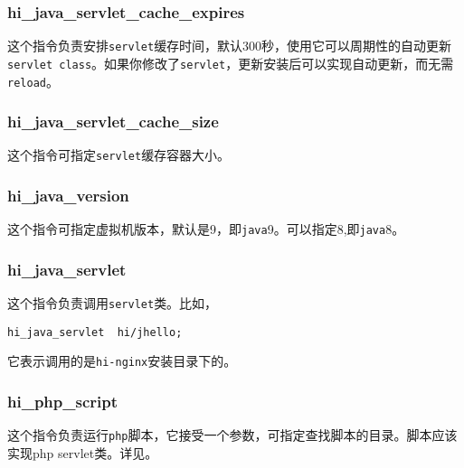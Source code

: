 \subsubsection{hi_java_servlet_cache_expires}
这个指令负责安排\texttt{servlet}缓存时间，默认300秒，使用它可以周期性的自动更新\texttt{servlet class}。如果你修改了\texttt{servlet}，更新安装后可以实现自动更新，而无需\texttt{reload}。
\subsubsection{hi_java_servlet_cache_size}
这个指令可指定\texttt{servlet}缓存容器大小。
\subsubsection{hi_java_version}
这个指令可指定虚拟机版本，默认是9，即\texttt{java}9。可以指定8,即\texttt{java}8。
\subsubsection{hi_java_servlet}
这个指令负责调用\texttt{servlet}类。比如，
\begin{lstlisting}
hi_java_servlet  hi/jhello;
\end{lstlisting}
它表示调用的是\texttt{hi-nginx}安装目录下的。

\subsubsection{hi_php_script}
这个指令负责运行\texttt{php}脚本，它接受一个参数，可指定查找脚本的目录。脚本应该实现php servlet类。详见。
















